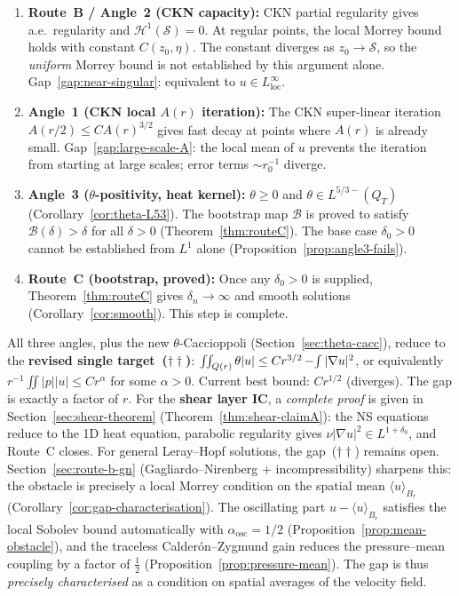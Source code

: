 \documentclass[11pt]{article}
\theoremstyle{definition}
\theoremstyle{remark}
\newcommand{\grad}{\nabla}
\newcommand{\Xint}{\mathop{\mathchoice{\vcenter{\hbox{$\displaystyle-$}}}%
  {\vcenter{\hbox{$\textstyle-$}}}%
  {\vcenter{\hbox{$\scriptstyle-$}}}%
  {\vcenter{\hbox{$\scriptscriptstyle-$}}}}\!\int}
\begin{document}
\begin{enumerate}
\item \textbf{Route~B / Angle~2 (CKN capacity):}
  CKN partial regularity gives a.e.\ regularity and $\mathcal{H}^1(\mathcal{S})=0$.
  At regular points, the local Morrey bound holds with constant $C(z_0,\eta)$.
  The constant diverges as $z_0\to\mathcal{S}$, so the \emph{uniform}
  Morrey bound is not established by this argument alone.
  Gap~\ref{gap:near-singular}: equivalent to $u\in L^\infty_{\mathrm{loc}}$.

\item \textbf{Angle~1 (CKN local $A(r)$ iteration):}
  The CKN super-linear iteration $A(r/2)\leq CA(r)^{3/2}$ gives fast
  decay at points where $A(r)$ is already small.
  Gap~\ref{gap:large-scale-A}: the local mean of $u$ prevents the
  iteration from starting at large scales; error terms $\sim r_0^{-1}$
  diverge.

\item \textbf{Angle~3 ($\theta$-positivity, heat kernel):}
  $\theta\geq 0$ and $\theta\in L^{5/3-}(Q_T)$ (Corollary~\ref{cor:theta-L53}).
  The bootstrap map $\mathcal{B}$ is proved to satisfy $\mathcal{B}(\delta)>\delta$
  for all $\delta>0$ (Theorem~\ref{thm:routeC}).  The base case $\delta_0>0$
  cannot be established from $L^1$ alone (Proposition~\ref{prop:angle3-fails}).

\item \textbf{Route~C (bootstrap, proved):}
  Once any $\delta_0>0$ is supplied, Theorem~\ref{thm:routeC} gives
  $\delta_n\to\infty$ and smooth solutions (Corollary~\ref{cor:smooth}).
  This step is complete.
\end{enumerate}

All three angles, plus the new $\theta$-Caccioppoli (Section~\ref{sec:theta-cacc}),
reduce to the \textbf{revised single target~($\dagger\dagger$)}:
$\iint_{Q(r)}\theta|u|\leq Cr^{3/2}\Xint|\grad u|^2$, or equivalently
$r^{-1}\iint|p||u|\leq Cr^\alpha$ for some $\alpha>0$.
Current best bound: $Cr^{1/2}$ (diverges). The gap is exactly a factor of $r$.
For the \textbf{shear layer IC}, a \emph{complete proof} is given in
Section~\ref{sec:shear-theorem} (Theorem~\ref{thm:shear-claimA}): the NS
equations reduce to the 1D heat equation, parabolic regularity gives
$\nu|\nabla u|^2\in L^{1+\delta_0}$, and Route~C closes.
For general Leray--Hopf solutions, the gap~($\dagger\dagger$) remains open.
Section~\ref{sec:route-b-gn} (Gagliardo--Nirenberg + incompressibility) sharpens this:
the obstacle is precisely a local Morrey condition on the spatial mean
$\langle u\rangle_{B_r}$ (Corollary~\ref{cor:gap-characterisation}).
The oscillating part $u-\langle u\rangle_{B_r}$ satisfies the local Sobolev bound
automatically with $\alpha_{\mathrm{osc}}=1/2$ (Proposition~\ref{prop:mean-obstacle}),
and the traceless Calderón--Zygmund gain reduces the pressure--mean coupling
by a factor of $\tfrac{1}{2}$ (Proposition~\ref{prop:pressure-mean}).
The gap is thus \emph{precisely characterised} as a condition on spatial averages
of the velocity field.
\end{document}
